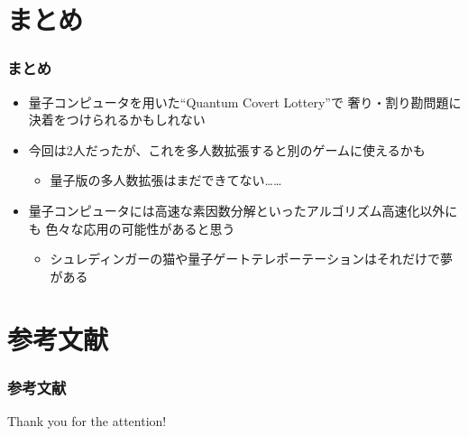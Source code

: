 \section{まとめ}

\begin{frame}
  \frametitle{まとめ}

  \pause
  \begin{itemize}
    \item<+-> 量子コンピュータを用いた``Quantum Covert Lottery''で
    奢り・割り勘問題に決着をつけられるかもしれない

    \item<+-> 今回は2人だったが、これを多人数拡張すると別のゲームに使えるかも
    \begin{itemize}
      \item 量子版の多人数拡張はまだできてない……
    \end{itemize}

    \item<+-> 量子コンピュータには高速な素因数分解といったアルゴリズム高速化以外にも
    色々な応用の可能性があると思う
    \begin{itemize}
      \item シュレディンガーの猫や量子ゲートテレポーテーションはそれだけで夢がある
    \end{itemize}
  \end{itemize}
\end{frame}

\section*{参考文献}
\begin{frame}[allowframebreaks]
  \frametitle{参考文献}
  
  
\end{frame}

\begin{frame}
  \centering
  {\Huge Thank you for the attention!}
\end{frame}


